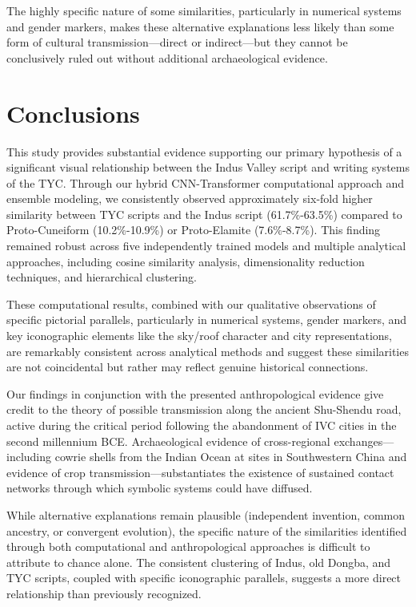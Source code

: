 \documentclass[11pt,a4paper,oneside]{report}
\begin{document}
The highly specific nature of some similarities, particularly in numerical systems and gender markers, makes these alternative explanations less likely than some form of cultural transmission—direct or indirect—but they cannot be conclusively ruled out without additional archaeological evidence.

\chapter{Conclusions}
\label{conclusions}
\noindent\hspace{1cm}
This study provides substantial evidence supporting our primary hypothesis of a significant visual relationship between the Indus Valley script and writing systems of the TYC. Through our hybrid CNN-Transformer computational approach and ensemble modeling, we consistently observed approximately six-fold higher similarity between TYC scripts and the Indus script (61.7\%-63.5\%) compared to Proto-Cuneiform (10.2\%-10.9\%) or Proto-Elamite (7.6\%-8.7\%). This finding remained robust across five independently trained models and multiple analytical approaches, including cosine similarity analysis, dimensionality reduction techniques, and hierarchical clustering.

These computational results, combined with our qualitative observations of specific pictorial parallels, particularly in numerical systems, gender markers, and key iconographic elements like the sky/roof character and city representations, are remarkably consistent across analytical methods and suggest these similarities are not coincidental but rather may reflect genuine historical connections.

Our findings in conjunction with the presented anthropological evidence give credit to the theory of possible transmission along the ancient Shu-Shendu road, active during the critical period following the abandonment of IVC cities in the second millennium BCE. Archaeological evidence of cross-regional exchanges—including cowrie shells from the Indian Ocean at sites in Southwestern China and evidence of crop transmission—substantiates the existence of sustained contact networks through which symbolic systems could have diffused.

While alternative explanations remain plausible (independent invention, common ancestry, or convergent evolution), the specific nature of the similarities identified through both computational and anthropological approaches is difficult to attribute to chance alone. The consistent clustering of Indus, old Dongba, and TYC scripts, coupled with specific iconographic parallels, suggests a more direct relationship than previously recognized.
\end{document}
